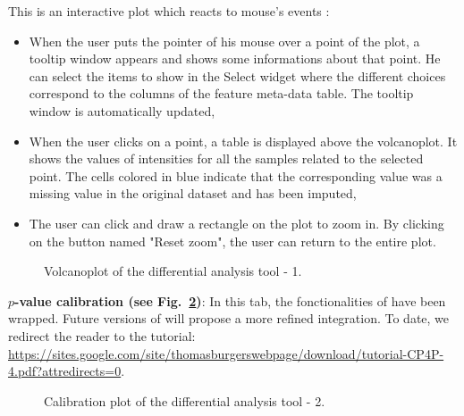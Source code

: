 \documentclass[12pt]{article}
\begin{document}
{This is an interactive plot which reacts to mouse's events :
\begin{itemize}
\item When the user puts the pointer of his mouse over a
point of the plot, a tooltip window appears and shows some informations about 
that point. He can select the items to show in the Select widget where the 
different choices correspond to the columns of the feature meta-data table. 
The tooltip window is automatically updated,
\item When the user clicks on a point, a table is displayed above the 
volcanoplot. It shows the values of intensities for all the samples related to
the selected point. The cells colored in blue indicate that the corresponding 
value was a missing value in the original dataset and has been imputed,
\item The user can click and draw a rectangle on the plot to zoom in. 
By clicking on the button named "Reset zoom", the user can return to the 
entire plot.
\end{itemize}

\begin {figure}
\centering
{}
\caption{Volcanoplot of the differential analysis tool - 1.}
\label{fig:anadiff1}
\end {figure}


\textbf{$p$-value calibration (see Fig.~\ref{fig:anadiff2})}: In this tab, 
the fonctionalities of  have been wrapped. Future versions of 
 will propose a more refined integration. To date, we 
redirect the reader to the  tutorial: 
\url{https://sites.google.com/site/thomasburgerswebpage/download/tutorial-CP4P-
4.pdf?attredirects=0}. 

\begin {figure}
\centering
{}
\caption{Calibration plot of the differential analysis tool - 2.}
\label{fig:anadiff2}
\end {figure}


}
\end{document}

